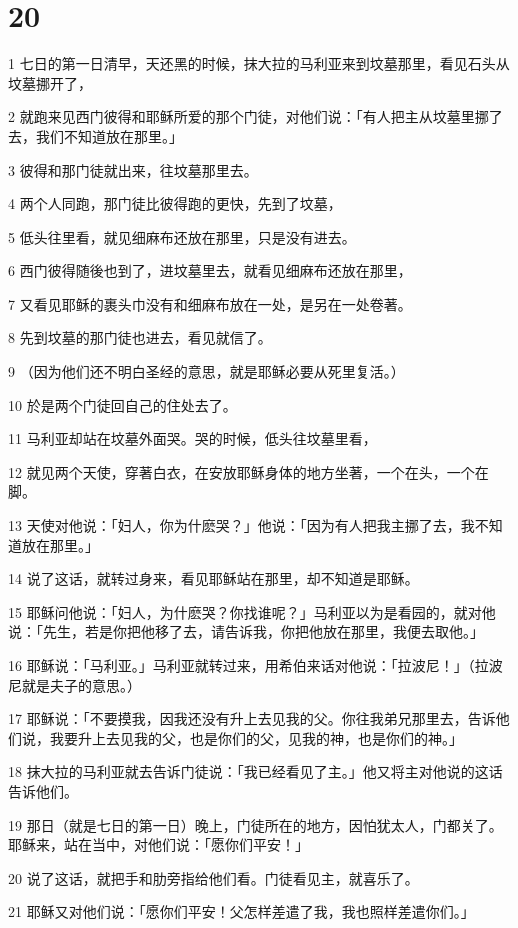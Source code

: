 \chapter{20}

\par 1 七日的第一日清早，天还黑的时候，抹大拉的马利亚来到坟墓那里，看见石头从坟墓挪开了，
\par 2 就跑来见西门彼得和耶稣所爱的那个门徒，对他们说：「有人把主从坟墓里挪了去，我们不知道放在那里。」
\par 3 彼得和那门徒就出来，往坟墓那里去。
\par 4 两个人同跑，那门徒比彼得跑的更快，先到了坟墓，
\par 5 低头往里看，就见细麻布还放在那里，只是没有进去。
\par 6 西门彼得随後也到了，进坟墓里去，就看见细麻布还放在那里，
\par 7 又看见耶稣的裹头巾没有和细麻布放在一处，是另在一处卷著。
\par 8 先到坟墓的那门徒也进去，看见就信了。
\par 9 （因为他们还不明白圣经的意思，就是耶稣必要从死里复活。）
\par 10 於是两个门徒回自己的住处去了。
\par 11 马利亚却站在坟墓外面哭。哭的时候，低头往坟墓里看，
\par 12 就见两个天使，穿著白衣，在安放耶稣身体的地方坐著，一个在头，一个在脚。
\par 13 天使对他说：「妇人，你为什麽哭？」他说：「因为有人把我主挪了去，我不知道放在那里。」
\par 14 说了这话，就转过身来，看见耶稣站在那里，却不知道是耶稣。
\par 15 耶稣问他说：「妇人，为什麽哭？你找谁呢？」马利亚以为是看园的，就对他说：「先生，若是你把他移了去，请告诉我，你把他放在那里，我便去取他。」
\par 16 耶稣说：「马利亚。」马利亚就转过来，用希伯来话对他说：「拉波尼！」（拉波尼就是夫子的意思。）
\par 17 耶稣说：「不要摸我，因我还没有升上去见我的父。你往我弟兄那里去，告诉他们说，我要升上去见我的父，也是你们的父，见我的神，也是你们的神。」
\par 18 抹大拉的马利亚就去告诉门徒说：「我已经看见了主。」他又将主对他说的这话告诉他们。
\par 19 那日（就是七日的第一日）晚上，门徒所在的地方，因怕犹太人，门都关了。耶稣来，站在当中，对他们说：「愿你们平安！」
\par 20 说了这话，就把手和肋旁指给他们看。门徒看见主，就喜乐了。
\par 21 耶稣又对他们说：「愿你们平安！父怎样差遣了我，我也照样差遣你们。」
